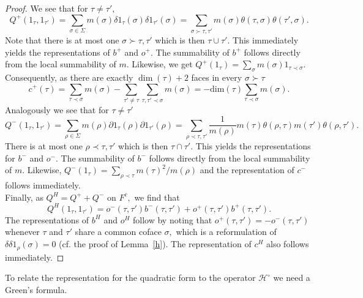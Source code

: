 \documentclass[10pt]{amsart}
\theoremstyle{definition}
\renewcommand{\bullet}{{\circ}}
\begin{document}
\begin{proof}
    We see that for $\tau\neq\tau'$,  
    $$Q^+(1_\tau,1_{\tau'}) = \sum_{\sigma\in \Sigma} m(\sigma)\delta 1_\tau(\sigma)\delta 1_{\tau'}(\sigma) = \sum_{\sigma\succ\tau,\tau'}  m(\sigma)\theta(\tau,\sigma)\theta(\tau',\sigma).$$
   Note that there is at most one $\sigma\succ\tau,\tau'$ which is then $\tau\cup\tau'$. This immediately yields the representations of $b^+$ and $o^+.$ The summability of $b^{+}$ follows directly from the local summability of $m$.    
   Likewise, we get $Q^+(1_\tau) = \sum_\sigma m(\sigma)1_{\tau\prec\sigma}.$ Consequently, as there are exactly $\dim (\tau )+2$ faces in every $\sigma\succ\tau$
    $$c^+(\tau) = \sum_{\tau\prec\sigma}m(\sigma)-\sum_{\tau'\neq\tau}\sum_{\tau,\tau'\prec\sigma}m(\sigma)
     = -\mathrm{dim}(\tau)\sum_{\tau\prec\sigma}m(\sigma).$$
    Analogously we see that for $\tau\neq\tau'$
    $$Q^-(1_\tau,1_{\tau'}) =\sum_{\rho\in \Sigma} m(\rho)\partial 1_\tau(\rho) \partial 1_{\tau'}(\rho) = \sum_{\rho\prec \tau,\tau'} \frac{1}{m(\rho)}m(\tau)\theta(\rho,\tau)m(\tau')\theta(\rho,\tau').$$
    There is at most one $\rho\prec\tau,\tau'$ which is then $\tau\cap{\tau}'$.
    This yields the representations for $b^-$ and $o^-.$  The summability of $b^{-}$ follows directly from the local summability of $m$.    
      Likewise, $Q^-(1_\tau) = \sum_{\rho\prec \tau}{m(\tau)^2}/{m(\rho)}$ and the representation of $c^-$ follows immediately.\\
    Finally, as $Q^H = Q^++Q^-$ on $F^c,$ we find that  
    $$Q^H(1_\tau,1_{\tau'}) =  o^-(\tau,\tau')b^-(\tau,\tau')+o^+(\tau,\tau')b^+(\tau,\tau').$$
    The representations of $b^H$ and $o^H$ follow by noting that $o^+(\tau,\tau') = -o^-(\tau,\tau')$ whenever $\tau$ and $\tau'$ share a common coface $\sigma,$ which is  a reformulation of $\delta\delta 1_\rho(\sigma) = 0$ (cf. the proof of Lemma~\ref{h}). The representation of $c^H$ also follows immediately.
\end{proof}

To relate the representation for the quadratic form to the operator $\mathcal{H}^{\bullet}$ we need a Green's formula.
\end{document}
